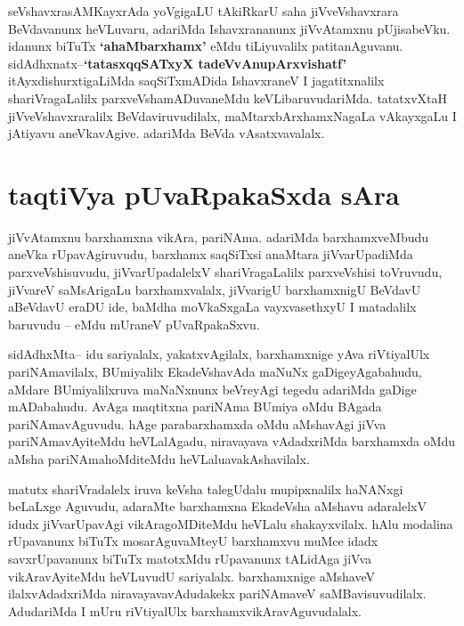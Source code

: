 \begin{artha}
seVshavxrasAMKayxrAda yoVgigaLU tAkiRkarU saha jiVveVshavxrara
BeVdavanunx heVLuvaru, adariMda Ishavxrananunx jiVvAtamxnu
pUjisabeVku. idanunx biTuTx \textbf{`ahaMbarxhamx'} eMdu tiLiyuvalilx
patitanAguvanu. sidAdhxnatx--\textbf{`tatasxqqSATxyX tadeVvAnupArxvishatf'}
itAyxdishurxtigaLiMda saqSiTxmADida IshavxraneV I jagatitxnalilx
shariVragaLalilx parxveVshamADuvaneMdu keVLibaruvudariMda. tatatxvXtaH
jiVveVshavxraralilx BeVdaviruvudilalx, maMtarxbArxhamxNagaLa
vAkayxgaLu I jAtiyavu aneVkavAgive. adariMda BeVda vAsatxvavalalx. 
\end{artha}

\section*{taqtiVya pUvaRpakaSxda sAra}

\begin{artha}
jiVvAtamxnu barxhamxna vikAra, pariNAma. adariMda barxhamxveMbudu aneVka rUpavAgiruvudu, barxhamx saqSiTxsi anaMtara jiVvarUpadiMda parxveVshisuvudu, jiVvarUpadalelxV shariVragaLalilx parxveVshisi toVruvudu, jiVvareV  saMsArigaLu barxhamxvalalx, jiVvarigU barxhamxnigU BeVdavU aBeVdavU eraDU ide, baMdha moVkaSxgaLa vayxvasethxyU I matadalilx baruvudu -- eMdu mUraneV pUvaRpakaSxvu.
\end{artha}

\begin{artha}
sidAdhxMta-- idu sariyalalx, yakatxvAgilalx, barxhamxnige yAva
riVtiyalUlx  pariNAmavilalx, BUmiyalilx EkadeVshavAda maNuNx
gaDigeyAgabahudu, aMdare BUmiyalilxruva maNaNxnunx beVreyAgi tegedu
adariMda gaDige mADabahudu. AvAga maqtitxna pariNAma BUmiya oMdu
BAgada pariNAmavAguvudu. hAge parabarxhamxda oMdu aMshavAgi jiVva
pariNAmavAyiteMdu heVLalAgadu, niravayava vAdadxriMda barxhamxda oMdu
aMsha pariNAmahoMditeMdu heVLaluavakAshavilalx.
\end{artha}

\begin{artha}
matutx shariVradalelx iruva keVsha talegUdalu mupipxnalilx haNANxgi
beLaLxge Aguvudu, adaraMte  barxhamxna EkadeVsha aMshavu adaralelxV
idudx jiVvarUpavAgi vikAragoMDiteMdu heVLalu shakayxvilalx. hAlu
modalina rUpavanunx biTuTx mosarAguvaMteyU barxhamxvu muMce idadx
savxrUpavanunx biTuTx matotxMdu rUpavanunx tALidAga jiVva
vikAravAyiteMdu heVLuvudU sariyalalx. barxhamxnige aMshaveV
ilalxvAdadxriMda niravayavavAdudakekx pariNAmaveV saMBavisuvudilalx.
AdudariMda I mUru riVtiyalUlx barxhamxvikAravAguvudalalx.
\end{artha}

